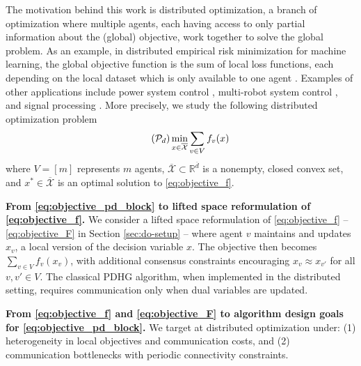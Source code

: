 \documentclass[10pt]{article}
\newcommand{\mc}{\mathcal}
\newcommand{\R}{\mathbb{R}}
\begin{document}
 The motivation behind this work is distributed optimization, a branch of optimization where multiple agents, each having access to only partial information about the (global) objective, work together to solve the global problem. As an example, in distributed empirical risk minimization for machine learning, the global objective function is the sum of local loss functions, each depending on the local dataset which is only available to one agent \cite{AssranAytekinFeyzmahdavianJohanssonRabbat2020,Boyd2011,Zhu2016,ArjevaniShamir2015Communication,Jakub2016}. Examples of other applications include power system control \cite{Molzahn2017,Nedic2018}, multi-robot system control \cite{Bullo2009,Nedic2018,Jaleel2020,Shorinwa2024}, and signal processing \cite{BertsekasTsitsiklis1989,Dan2002,Rabbat2004}. More precisely, we study the following distributed optimization problem
\begin{equation}\label{eq:objective_f}\tag{$\mc P_{d}$}
    \min_{x\in \overline{\mc X}} \sum_{v\in V} f_v(x)
\end{equation}
where $V = [m]$ represents $m$ agents, $\overline{\mc X}\subset \R^{\overline{d}}$ is a nonempty, closed convex set, and $x^*\in \overline{\mc X}$ is an optimal solution to \eqref{eq:objective_f}. 

\textbf{From \eqref{eq:objective_pd_block} to lifted space reformulation of \eqref{eq:objective_f}.} We consider a lifted space reformulation of \eqref{eq:objective_f} -- \eqref{eq:objective_F} in Section \ref{sec:do-setup} -- where agent $v$ maintains and updates $x_v$, a local version of the decision variable $x$. The objective then becomes $\sum_{v\in V} f_v(x_v)$, with additional consensus constraints encouraging $x_v\approx x_{v'}$ for all $v,v'\in V$. The classical PDHG algorithm, when implemented in the distributed setting, requires  communication only when dual variables are updated. 


\textbf{From \eqref{eq:objective_f} and \eqref{eq:objective_F} to algorithm design goals for \eqref{eq:objective_pd_block}.} We target at distributed optimization under: (1) heterogeneity in local objectives and communication costs, and (2) communication bottlenecks with periodic connectivity constraints. 
\end{document}
